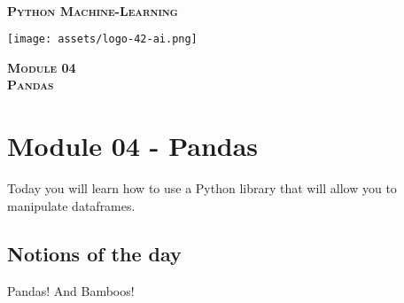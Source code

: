\documentclass[]{article}
\date{}
\begin{document}

\vspace*{2cm}
\begin{center}
    \textsc{\fontsize{40}{48} \bfseries }\\[0.6cm]
    \textsc{\fontsize{39}{48} \bfseries { %
Python Machine-Learning
    }}\\[0.3cm]
\end{center}
\vspace{3cm}

\begin{center}
\texttt{[image: assets/logo-42-ai.png]}{\centering}
\end{center}

\vspace*{2cm}
\begin{center}
    \textsc{\fontsize{32}{48} \bfseries %
Module 04    
    }\\[0.6cm]
    \textsc{\fontsize{32}{48} \bfseries %
Pandas    
    }\\[0.3cm]
\end{center}
\vspace{3cm}

\newpage

\setcounter{page}{1}



\hypertarget{module-04---pandas}{%
\section{Module 04 - Pandas}\label{module-04---pandas}}

Today you will learn how to use a Python library that will allow you to
manipulate dataframes.

\hypertarget{notions-of-the-day}{%
\subsection{Notions of the day}\label{notions-of-the-day}}

Pandas! And Bamboos!
\end{document}
